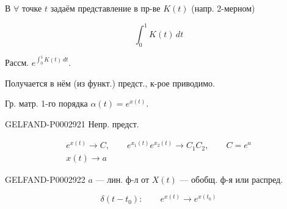В $\forall$ точке $t$ задаём представление в пр-ве $K(t)$ (напр. 2-мерном)

\begin{equation*}\int_0^1 K(t)\,dt\end{equation*}



\hfill{}

Рассм. $e^{\int_0^1 K(t)\,dt}$.

Получается в нём (из функт.) предст., к-рое приводимо.

\begin{center}\end{center}

Гр. матр. 1-го порядка $\alpha(t)=e^{x(t)}$.

\begin{GelfandAdjacentEvidence}{GELFAND-P000292}{1}
Непр. предст.

\end{GelfandAdjacentEvidence}


\begin{gather*}e^{x(t)}\longrightarrow C,\qquad e^{x_1(t)}e^{x_2(t)}\longrightarrow C_1C_2,\qquad C=e^a\\x(t)\longrightarrow a\end{gather*}

\begin{GelfandAdjacentEvidence}{GELFAND-P000292}{2}
$a$ --- лин. ф-л от $X(t)$ --- обобщ. ф-я или распред.

\end{GelfandAdjacentEvidence}


\begin{equation*}\delta(t-t_0):\qquad e^{x(t)}\longrightarrow e^{x(t_0)}\end{equation*}

